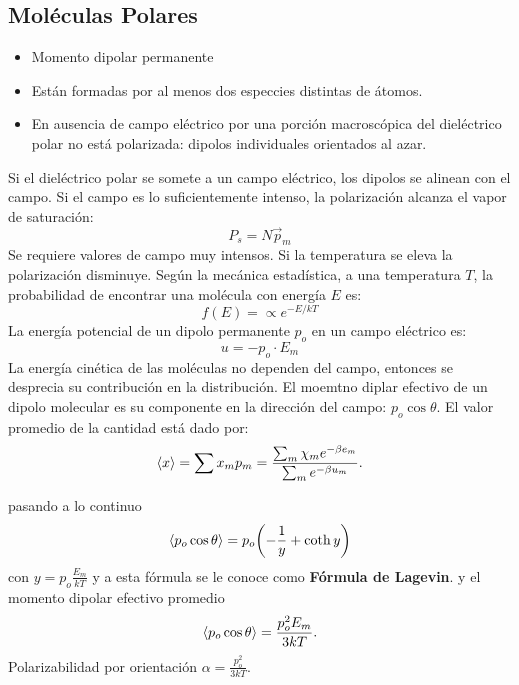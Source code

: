 \subsection{Moléculas Polares}
\begin{itemize}
	\item Momento dipolar permanente
	\item Están formadas por al menos dos especcies distintas de átomos.
	\item En ausencia de campo eléctrico por una porción macroscópica del dieléctrico polar no está polarizada: dipolos individuales orientados al azar.
\end{itemize}
Si el dieléctrico polar se somete a un campo eléctrico, los dipolos se alinean con el campo. Si el campo es lo suficientemente intenso, la polarización alcanza el vapor de saturación: 
\begin{equation}
	P_s = N\vec{p}_m
\end{equation}
Se requiere valores de campo muy intensos. Si la temperatura se eleva la polarización disminuye. Según la mecánica estadística, a una temperatura $T$, la probabilidad de encontrar una molécula con energía $E$ es:
\begin{equation}
	f(E) = \propto e^{-E/kT}
\end{equation}
La energía potencial de un dipolo permanente $p_o$ en un campo eléctrico es:
\begin{equation}
	u = -p_o \cdot E_m
\end{equation}
La energía cinética de las moléculas no dependen del campo, entonces se desprecia su contribución en la distribución. El moemtno diplar efectivo de un dipolo molecular es su componente en la dirección del campo: $p_o \cos{\theta}$. El valor promedio de la cantidad está dado por:
\begin{equation}
	\expval{x}  =\sum x_m p_m = \frac{\sum _m \chi _m e^{-\beta e_m}}{\sum _m e^{-\beta u_m}}.
\end{equation}

pasando a lo continuo
\begin{equation}
	\expval{p_o \cos{\theta}} = p_o \qty(-\frac{1}{y} + \coth{y})
\end{equation}
con $y = p_o \frac{E_m}{kT}$ y a esta fórmula se le conoce como \textbf{Fórmula de Lagevin}. y el momento dipolar efectivo promedio
\begin{equation}
	\expval{p_o \cos{\theta}} = \frac{p_o ^2 E_m}{3kT}.
\end{equation}
Polarizabilidad por orientación $\alpha = \frac{p_o ^2}{3kT}$.

